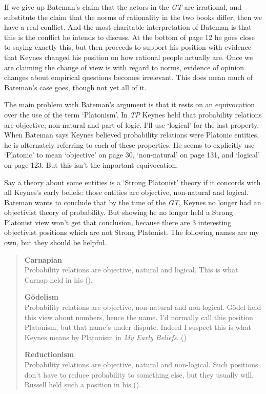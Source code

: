 \documentclass[
  11pt,
  letterpaper,
  DIV=11,
  numbers=noendperiod,
  twoside]{scrartcl}
\begin{document}
If we give up Bateman's claim that the actors in the \emph{GT} are
irrational, and substitute the claim that the norms of rationality in
the two books differ, then we have a real conflict. And the most
charitable interpretation of Bateman is that this is the conflict he
intends to discuss. At the bottom of page 12 he goes close to saying
exactly this, but then proceeds to support his position with evidence
that Keynes changed his position on how rational people actually are.
Once we are claiming the change of view is with regard to norms,
evidence of opinion changes about empirical questions becomes
irrelevant. This does mean much of Bateman's case goes, though not yet
all of it.

The main problem with Bateman's argument is that it rests on an
equivocation over the use of the term `Platonism'. In \emph{TP} Keynes
held that probability relations are objective, non-natural and part of
logic. I'll use `logical' for the last property. When Bateman says
Keynes believed probability relations were Platonic entities, he is
alternately referring to each of these properties. He seems to
explicitly use `Platonic' to mean `objective' on page 30, `non-natural'
on page 131, and `logical' on page 123. But this isn't the important
equivocation.

Say a theory about some entities is a `Strong Platonist' theory if it
concords with all Keynes's early beliefs: those entities are objective,
non-natural and logical. Bateman wants to conclude that by the time of
the \emph{GT}, Keynes no longer had an objectivist theory of
probability. But showing he no longer held a Strong Platonist view won't
get that conclusion, because there are 3 interesting objectivist
positions which are not Strong Platonist. The following names are my
own, but they should be helpful.

\begin{quote}
\textbf{Carnapian}\\
Probability relations are objective, natural and logical. This is what
Carnap held in his ().

\textbf{Gödelism}\\
Probability relations are objective, non-natural and non-logical. Gödel
held this view about numbers, hence the name. I'd normally call this
position Platonism, but that name's under dispute. Indeed I suspect this
is what Keynes means by Platonism in \emph{My Early Beliefs}.
()

\textbf{Reductionism}\\
Probability relations are objective, natural and non-logical. Such
positions don't have to reduce probability to something else, but they
usually will. Russell held such a position in his
().
\end{quote}
\end{document}
